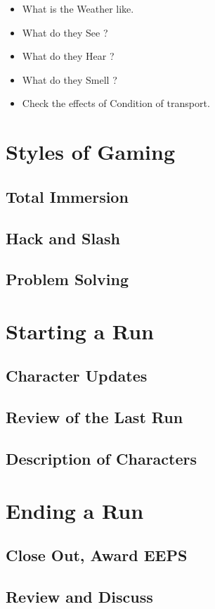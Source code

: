 \begin{itemize}
    \item What is the Weather like.
    \item What do they See ? 
    \item What do they Hear ?
    \item What do they Smell ?
	\item Check the effects of Condition of transport.
\end{itemize}

\section{Styles of Gaming}
	\subsection{Total Immersion}
	\subsection{Hack and Slash}
	\subsection{Problem Solving}

\section{Starting a Run}
	\subsection{Character Updates}
	\subsection{Review of the Last Run}
	\subsection{Description of Characters}

\section{Ending a Run}
	\subsection{Close Out, Award EEPS}	
	\subsection{Review and Discuss}

